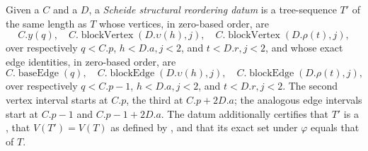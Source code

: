\begin{definition}
Given a  $C$ and a
 $D$, a \emph{Scheide structural
reordering datum} is a tree-sequence $T'$ of the same length as $T$ whose
vertices, in zero-based order, are
\[
 C.y(q),\quad
 C.\operatorname{blockVertex}(D.\upsilon(h),j),\quad
 C.\operatorname{blockVertex}(D.\rho(t),j),
\]
over respectively $q<C.p$, $h<D.a,j<2$, and $t<D.r,j<2$, and whose exact
edge identities, in zero-based order, are
\[
 C.\operatorname{baseEdge}(q),\quad
 C.\operatorname{blockEdge}(D.\upsilon(h),j),\quad
 C.\operatorname{blockEdge}(D.\rho(t),j),
\]
over respectively $q<C.p-1$, $h<D.a,j<2$, and $t<D.r,j<2$.  The second
vertex interval starts at $C.p$, the third at $C.p+2D.a$; the analogous
edge intervals start at $C.p-1$ and $C.p-1+2D.a$.  The datum additionally
certifies that $T'$ is a , that
$V(T')=V(T)$ as defined by , and that its
exact  set under $\varphi$ equals
that of $T$.
\end{definition}
